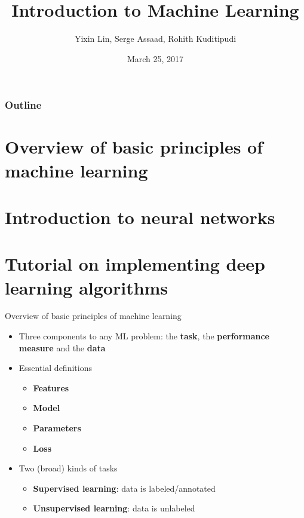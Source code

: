 \documentclass{beamer}
\title[Intro to ML]{Introduction to Machine Learning} %
\author{Yixin Lin, Serge Assaad, Rohith Kuditipudi} %
\institute[Duke] %
{
Duke University \\ %
\medskip
\textit{yixin.lin@duke.edu, serge.assaad@duke.edu, rohith.kuditipudi@duke.edu} %
}
\date{March 25, 2017} %
\begin{document}
\begin{frame}
\titlepage %
\end{frame}

\begin{frame}
\frametitle{Outline} %
\tableofcontents %
\section{Overview of basic principles of machine learning}
\section{Introduction to neural networks}
\section{Tutorial on implementing deep learning algorithms}
\end{frame}


\begin{frame}{Overview of basic principles of machine learning}
\begin{itemize}
    \item Three components to any ML problem: the \textbf{task}, the \textbf{performance measure} and the \textbf{data}
    \item Essential definitions
    \begin{itemize}
        \item \textbf{Features}
        \item \textbf{Model}
        \item \textbf{Parameters}
        \item \textbf{Loss}
        
    \end{itemize}
    \item Two (broad) kinds of tasks
    \begin{itemize}
        \item \textbf{Supervised learning}: data is labeled/annotated
        \item \textbf{Unsupervised learning}: data is unlabeled 
    \end{itemize}
    
\end{itemize}
    
\end{frame}
\end{document}
